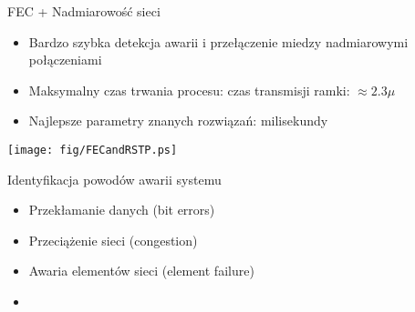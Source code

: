 \documentclass[compress,red]{beamer}
\begin{document}
\begin{frame}{FEC + Nadmiarowość sieci}

  \begin{itemize}
    \item Bardzo szybka detekcja awarii i przełączenie miedzy nadmiarowymi połączeniami
    \item Maksymalny czas trwania procesu: czas transmisji ramki: $\approx 2.3 \mu$
    \item Najlepsze parametry znanych rozwiązań: milisekundy
  \end{itemize}

      \begin{center}
      \texttt{[image: fig/FECandRSTP.ps]}
      \end{center}


\end{frame}
\begin{frame}{Identyfikacja powodów awarii systemu}


  \begin{itemize}
    \item Przekłamanie danych (bit errors)
    \item Przeciążenie sieci (congestion)
    \item Awaria elementów sieci (element failure)
    \item {}
  \end{itemize}

\end{frame}
\end{document}
